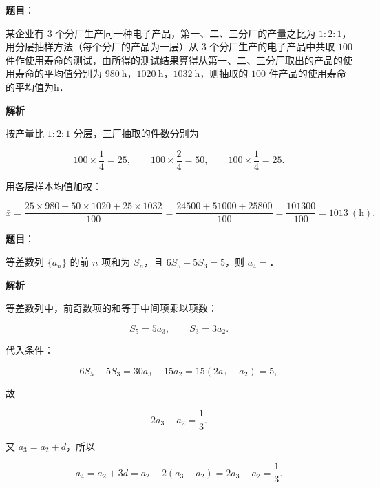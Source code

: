 \begin{answer}

\textbf{题目}：

某企业有 $3$ 个分厂生产同一种电子产品，第一、二、三分厂的产量之比为 $1:2:1$，用分层抽样方法（每个分厂的产品为一层）从 $3$ 个分厂生产的电子产品中共取 $100$ 件作使用寿命的测试，由所得的测试结果算得从第一、二、三分厂取出的产品的使用寿命的平均值分别为 $980\ \mathrm h$，$1020\ \mathrm h$，$1032\ \mathrm h$，则抽取的 $100$ 件产品的使用寿命的平均值为\gkblank{}$\mathrm h$．

\textbf{解析}

按产量比 $1:2:1$ 分层，三厂抽取的件数分别为

\nopagebreak[4]
\[100\times\frac14=25,\qquad
100\times\frac24=50,\qquad
100\times\frac14=25 .\]

用各层样本均值加权：

\nopagebreak[4]
\[\bar x=\frac{25\times980+50\times1020+25\times1032}{100}
=\frac{24500+51000+25800}{100}
=\frac{101300}{100}
=1013\ (\mathrm h).\]


\end{answer}
\begin{answer}

\textbf{题目}：

等差数列 $\{a_n\}$ 的前 $n$ 项和为 $S_n$，且 $6S_5-5S_3=5$，则 $a_4=$\gkblank{}．

\textbf{解析}

等差数列中，前奇数项的和等于中间项乘以项数：

\nopagebreak[4]
\[S_5=5a_3,\qquad S_3=3a_2 .\]

代入条件：

\nopagebreak[4]
\[6S_5-5S_3=30a_3-15a_2=15(2a_3-a_2)=5,\]

故

\nopagebreak[4]
\[2a_3-a_2=\frac13 .\]

又 $a_3=a_2+d$，所以

\nopagebreak[4]
\[a_4=a_2+3d=a_2+2(a_3-a_2)=2a_3-a_2=\frac13 .\]


\end{answer}
